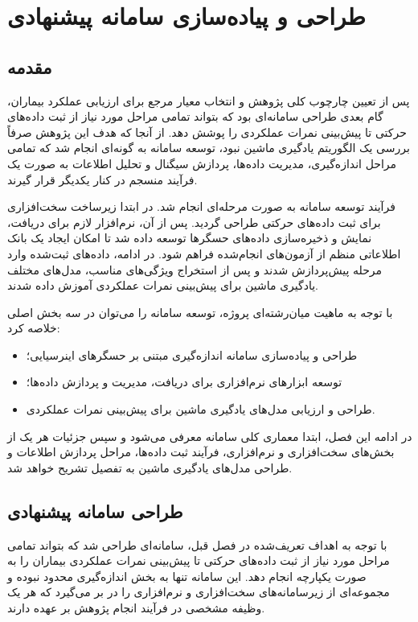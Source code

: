 \section{طراحی و پیاده‌سازی سامانه پیشنهادی}

\subsection{مقدمه}

پس از تعیین چارچوب کلی پژوهش و انتخاب معیار مرجع برای ارزیابی عملکرد بیماران، گام بعدی طراحی سامانه‌ای بود که بتواند تمامی مراحل مورد نیاز از ثبت داده‌های حرکتی تا پیش‌بینی نمرات عملکردی را پوشش دهد. از آنجا که هدف این پژوهش صرفاً بررسی یک الگوریتم یادگیری ماشین نبود، توسعه سامانه به گونه‌ای انجام شد که تمامی مراحل اندازه‌گیری، مدیریت داده‌ها، پردازش سیگنال و تحلیل اطلاعات به صورت یک فرآیند منسجم در کنار یکدیگر قرار گیرند.

فرآیند توسعه سامانه به صورت مرحله‌ای انجام شد. در ابتدا زیرساخت سخت‌افزاری برای ثبت داده‌های حرکتی طراحی گردید. پس از آن، نرم‌افزار لازم برای دریافت، نمایش و ذخیره‌سازی داده‌های حسگرها توسعه داده شد تا امکان ایجاد یک بانک اطلاعاتی منظم از آزمون‌های انجام‌شده فراهم شود. در ادامه، داده‌های ثبت‌شده وارد مرحله پیش‌پردازش شدند و پس از استخراج ویژگی‌های مناسب، مدل‌های مختلف یادگیری ماشین برای پیش‌بینی نمرات عملکردی آموزش داده شدند.

با توجه به ماهیت میان‌رشته‌ای پروژه، توسعه سامانه را می‌توان در سه بخش اصلی خلاصه کرد:

\begin{itemize}
	\item طراحی و پیاده‌سازی سامانه اندازه‌گیری مبتنی بر حسگرهای اینرسیایی؛
	\item توسعه ابزارهای نرم‌افزاری برای دریافت، مدیریت و پردازش داده‌ها؛
	\item طراحی و ارزیابی مدل‌های یادگیری ماشین برای پیش‌بینی نمرات عملکردی.
\end{itemize}

در ادامه این فصل، ابتدا معماری کلی سامانه معرفی می‌شود و سپس جزئیات هر یک از بخش‌های سخت‌افزاری و نرم‌افزاری، فرآیند ثبت داده‌ها، مراحل پردازش اطلاعات و طراحی مدل‌های یادگیری ماشین به تفصیل تشریح خواهد شد.

\subsection{طراحی سامانه پیشنهادی}

با توجه به اهداف تعریف‌شده در فصل قبل، سامانه‌ای طراحی شد که بتواند تمامی مراحل مورد نیاز از ثبت داده‌های حرکتی تا پیش‌بینی نمرات عملکردی بیماران را به صورت یکپارچه انجام دهد. این سامانه تنها به بخش اندازه‌گیری محدود نبوده و مجموعه‌ای از زیرسامانه‌های سخت‌افزاری و نرم‌افزاری را در بر می‌گیرد که هر یک وظیفه مشخصی در فرآیند انجام پژوهش بر عهده دارند.

